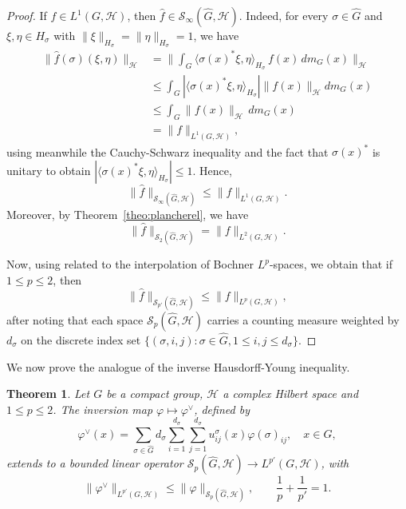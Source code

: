 \documentclass[11pt]{amsart}
\newtheorem{theorem}{Theorem}[section]
\begin{document}
\begin{proof}
If $f\in L^1(G,\mathcal{H})$, then $\widehat{f}\in \mathscr{S}_\infty(\widehat{G},\mathcal{H})$. Indeed,
for every $\sigma\in\widehat{G}$ and $\xi,\eta\in H_\sigma$ with
$\|\xi\|_{H_\sigma}=\|\eta\|_{H_\sigma}=1$, we have
\begin{align*}
\|\hat f(\sigma)(\xi,\eta)\|_\mathcal{H}&=\Big\|\int_G\langle\sigma(x)^*\xi,\eta\rangle_{H_\sigma}\,
f(x)\,dm_G(x)\Big\|_\mathcal{H}\\
&\le \int_G|\langle\sigma(x)^*\xi,\eta\rangle_{H_\sigma}|
\|f(x)\|_\mathcal{H}dm_G(x)\\
&\le\int_G\|f(x)\|_\mathcal{H}\,dm_G(x)\\
&=\|f\|_{L^1(G,\mathcal{H})},
\end{align*}
using meanwhile the Cauchy-Schwarz inequality and the fact that  $\sigma(x)^*$ is unitary to obtain $|\langle\sigma(x)^*\xi,\eta\rangle_{H_\sigma}|\le1$.
Hence, 
\begin{equation}\label{OneInfinity}
\|\widehat f\|_{\mathscr{S}_\infty(\widehat{G},\mathcal{H})}\le\|f\|_{L^1(G,\mathcal{H})}. 
\end{equation}
Moreover, by Theorem~\ref{theo:plancherel}, we have 
\begin{equation}
\|\widehat f\|_{\mathscr{S}_2(\widehat{G},\mathcal{H})}=\|f\|_{L^2(G,\mathcal{H})}. 
\end{equation}

Now, using  \cite[Theorem 5.1.2]{BerghLofstrom} related to the  interpolation of  Bochner $L^p$-spaces,  we obtain  that if $1\leq p\leq 2$, then  
$$
\|\widehat f\|_{\mathscr{S}_{p'}(\widehat{G},\mathcal{H})}\le\|f\|_{L^p(G,\mathcal{H})},
$$
after noting that  each  space  $\mathscr{S}_p(\widehat{G},\mathcal{H})$ carries a  counting measure 
weighted by $d_\sigma$ on the discrete index set $\{(\sigma,i,j):\sigma\in \widehat{G}, 1\le i,j\le d_\sigma\}$. 
\end{proof}


We now prove the analogue of the inverse Hausdorff-Young inequality.
\begin{theorem}\label{theo:invHY}
Let $G$ be a compact group,  $\mathcal{H}$  a complex Hilbert space  and $1\le p\le2$. The inversion map $\varphi\mapsto\varphi^\vee$, defined by
\begin{equation}
\varphi^\vee(x)=\sum_{\sigma\in\widehat{G}}d_\sigma\sum_{i=1}^{d_\sigma}\sum_{j=1}^{d_\sigma}u^\sigma_{ij}(x)\varphi(\sigma)_{ij},\quad x\in G,
\end{equation}
extends to a bounded linear operator $\mathscr{S}_p(\widehat{G},\mathcal{H})\to L^{p'}(G,\mathcal{H})$, with
\[
\|\varphi^\vee\|_{L^{p'}(G,\mathcal{H})}\le\|\varphi\|_{\mathscr{S}_p(\widehat{G},\mathcal{H})},\qquad
\frac1p+\frac1{p'}=1.
\]
\end{theorem}
\end{document}
